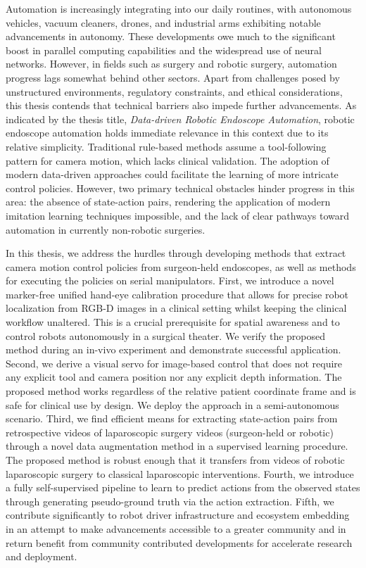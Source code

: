 Automation is increasingly integrating into our daily routines, with autonomous vehicles, vacuum cleaners, drones, and industrial arms exhibiting notable advancements in autonomy. These developments owe much to the significant boost in parallel computing capabilities and the widespread use of neural networks. However, in fields such as surgery and robotic surgery, automation progress lags somewhat behind other sectors. Apart from challenges posed by unstructured environments, regulatory constraints, and ethical considerations, this thesis contends that technical barriers also impede further advancements. As indicated by the thesis title, \textit{Data-driven Robotic Endoscope Automation}, robotic endoscope automation holds immediate relevance in this context due to its relative simplicity. Traditional rule-based methods assume a tool-following pattern for camera motion, which lacks clinical validation. The adoption of modern data-driven approaches could facilitate the learning of more intricate control policies. However, two primary technical obstacles hinder progress in this area: the absence of state-action pairs, rendering the application of modern imitation learning techniques impossible, and the lack of clear pathways toward automation in currently non-robotic surgeries.

In this thesis, we address the hurdles through developing methods that extract camera motion control policies from surgeon-held endoscopes, as well as methods for executing the policies on serial manipulators. First, we introduce a novel marker-free unified hand-eye calibration procedure that allows for precise robot localization from RGB-D images in a clinical setting whilst keeping the clinical workflow unaltered. This is a crucial prerequisite for spatial awareness and to control robots autonomously in a surgical theater. We verify the proposed method during an in-vivo experiment and demonstrate successful application. Second, we derive a visual servo for image-based control that does not require any explicit tool and camera position nor any explicit depth information. The proposed method works regardless of the relative patient coordinate frame and is safe for clinical use by design. We deploy the approach in a semi-autonomous scenario.
Third, we find efficient means for extracting state-action pairs from retrospective videos of laparoscopic surgery videos (surgeon-held or robotic) through a novel data augmentation method in a supervised learning procedure. The proposed method is
robust enough
that it transfers from videos of robotic laparoscopic surgery to classical laparoscopic interventions. Fourth, we introduce a fully self-supervised pipeline to learn to predict actions from the observed states through generating pseudo-ground truth via the action extraction. Fifth, we contribute significantly to robot driver infrastructure and ecosystem embedding in an attempt to make advancements accessible to a greater community and in return benefit from community contributed developments for accelerate research and deployment.


